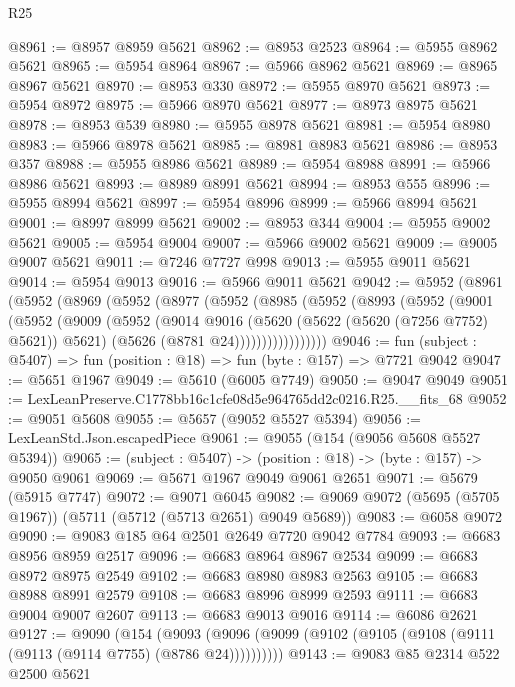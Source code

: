 \begin{lexlean}{R25}
\begin{coremodule}
@8961 := @8957 @8959 @5621
@8962 := @8953 @2523
@8964 := @5955 @8962 @5621
@8965 := @5954 @8964
@8967 := @5966 @8962 @5621
@8969 := @8965 @8967 @5621
@8970 := @8953 @330
@8972 := @5955 @8970 @5621
@8973 := @5954 @8972
@8975 := @5966 @8970 @5621
@8977 := @8973 @8975 @5621
@8978 := @8953 @539
@8980 := @5955 @8978 @5621
@8981 := @5954 @8980
@8983 := @5966 @8978 @5621
@8985 := @8981 @8983 @5621
@8986 := @8953 @357
@8988 := @5955 @8986 @5621
@8989 := @5954 @8988
@8991 := @5966 @8986 @5621
@8993 := @8989 @8991 @5621
@8994 := @8953 @555
@8996 := @5955 @8994 @5621
@8997 := @5954 @8996
@8999 := @5966 @8994 @5621
@9001 := @8997 @8999 @5621
@9002 := @8953 @344
@9004 := @5955 @9002 @5621
@9005 := @5954 @9004
@9007 := @5966 @9002 @5621
@9009 := @9005 @9007 @5621
@9011 := @7246 @7727 @998
@9013 := @5955 @9011 @5621
@9014 := @5954 @9013
@9016 := @5966 @9011 @5621
@9042 := @5952
    (@8961
      (@5952
        (@8969
          (@5952
            (@8977
              (@5952
                (@8985
                  (@5952
                    (@8993
                      (@5952
                        (@9001
                          (@5952
                            (@9009
                              (@5952
                                (@9014
                                  @9016
                                  (@5620 (@5622 (@5620 (@7256 @7752) @5621)) @5621)
                                  (@5626 (@8781 @24)))))))))))))))))
@9046 := fun (subject : @5407) => fun (position : @18) => fun (byte : @157) => @7721 @9042
@9047 := @5651 @1967
@9049 := @5610 (@6005 @7749)
@9050 := @9047 @9049
@9051 := LexLeanPreserve.C1778bb16c1cfe08d5e964765dd2c0216.R25.__fits_68
@9052 := @9051 @5608
@9055 := @5657 (@9052 @5527 @5394)
@9056 := LexLeanStd.Json.escapedPiece
@9061 := @9055 (@154 (@9056 @5608 @5527 @5394))
@9065 := (subject : @5407) -> (position : @18) -> (byte : @157) -> @9050 @9061
@9069 := @5671 @1967 @9049 @9061 @2651
@9071 := @5679 (@5915 @7747)
@9072 := @9071 @6045
@9082 := @9069 @9072 (@5695 (@5705 @1967)) (@5711 (@5712 (@5713 @2651) @9049 @5689))
@9083 := @6058 @9072
@9090 := @9083 @185 @64 @2501 @2649 @7720 @9042 @7784
@9093 := @6683 @8956 @8959 @2517
@9096 := @6683 @8964 @8967 @2534
@9099 := @6683 @8972 @8975 @2549
@9102 := @6683 @8980 @8983 @2563
@9105 := @6683 @8988 @8991 @2579
@9108 := @6683 @8996 @8999 @2593
@9111 := @6683 @9004 @9007 @2607
@9113 := @6683 @9013 @9016
@9114 := @6086 @2621
@9127 := @9090
    (@154 (@9093 (@9096 (@9099 (@9102 (@9105 (@9108 (@9111 (@9113 (@9114 @7755) (@8786 @24))))))))))
@9143 := @9083
    @85
    @2314
    @522
    @2500
    @5621

\end{coremodule}
\end{lexlean}
